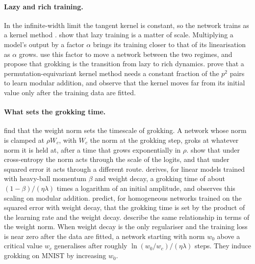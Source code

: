 \documentclass[a4paper,11pt]{article} %
\begin{document}
\paragraph{Lazy and rich training.}
In the infinite-width limit the tangent kernel is constant, so the network
trains as a kernel method \citep{jacotNeuralTangentKernel2020}.
\citet{chizatLazyTrainingDifferentiable2020} show that lazy training is a matter
of scale. Multiplying a model's output by a factor $\alpha$ brings its training
closer to that of its linearisation as $\alpha$ grows.
\citet{kumarGrokkingTransitionLazy2024} use this factor to move a network
between the two regimes, and propose that grokking is the transition from lazy
to rich dynamics. \citet{mohamadiWhyYouGrok2024} prove that a
permutation-equivariant kernel method needs a constant fraction of the $p^2$
pairs to learn modular addition, and observe that the kernel moves far from its
initial value only after the training data are fitted.

\paragraph{What sets the grokking time.}
\citet{khanhWeightNormSets2026} find that the weight norm sets the timescale of
grokking. A network whose norm is clamped at $\rho W_c$, with $W_c$ the norm
at the grokking step, groks at whatever norm it is held at, after a time that
grows exponentially in $\rho$.
\citet{khanhWhatDoesWeight2026} show that under cross-entropy the norm acts
through the scale of the logits, and that under squared error it acts through a
different route. \citet[Cor.~5, Eq.~20, arXiv
v1]{kimGrokkingWeightDecayClock2026}
derives, for linear models trained with heavy-ball momentum $\beta$ and weight
decay, a grokking time of about $(1-\beta)/(\eta\lambda)$ times a
logarithm of an
initial amplitude, and observes this scaling on modular addition.
\citet{pracherSpectralTheoryGrokking2026} predict, for homogeneous networks
trained on the squared error with weight decay, that the grokking time is set by
the product of the learning rate and the weight decay.
\citet{liuOmnigrokGrokkingAlgorithmic2023}
describe the same relationship in terms of the weight norm.
When weight decay is the only regulariser and the training loss is near zero
after the data are fitted, a network starting with norm $w_0$ above a critical
value $w_c$ generalises after roughly $\ln(w_0/w_c)/(\eta\lambda)$ steps.
They induce grokking on MNIST by increasing $w_0$.
\end{document}
